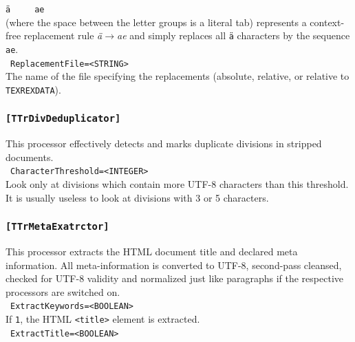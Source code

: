 \documentclass[12pt,a4paper]{article}
\begin{document}
\noindent\texttt{ä}\ \ \ \ \ \texttt{ae}\\

\noindent (where the space between the letter groups is a literal tab) represents a context-free replacement rule \textit{ä$\longrightarrow$ae} and simply replaces all \texttt{ä} characters by the sequence \texttt{ae}.\\

\noindent\textbullet~\texttt{ReplacementFile=<STRING>}\\

The name of the file specifying the replacements (absolute, relative, or relative to \texttt{TEXREXDATA}).\\


\subsubsection{\texttt{[TTrDivDeduplicator]}}
\label{sec:divdeduplicator}

This processor effectively detects and marks duplicate divisions in stripped documents.\\

\noindent\textbullet~\texttt{CharacterThreshold=<INTEGER>}\\

Look only at divisions which contain more UTF-8 characters than this threshold.
It is usually useless to look at divisions with 3 or 5 characters.\\

\subsubsection{\texttt{[TTrMetaExatrctor]}}
\label{sec:metaextractor}

This processor extracts the HTML document title and declared meta information.
All meta-information is converted to UTF-8, second-pass cleansed, checked for UTF-8 validity and normalized just like paragraphs if the respective processors are switched on.\\

\noindent\textbullet~\texttt{ExtractKeywords=<BOOLEAN>}\\

If \texttt{1}, the HTML \texttt{<title>} element is extracted.\\

\noindent\textbullet~\texttt{ExtractTitle=<BOOLEAN>}\\
\end{document}
